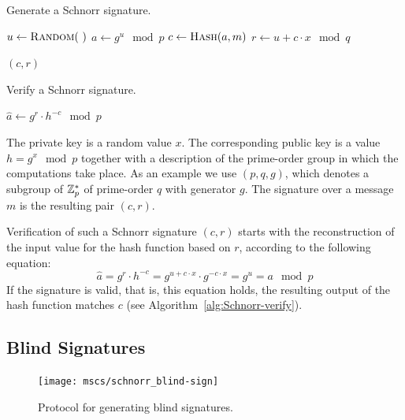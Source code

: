 \begin{algorithm}
  \caption{Generate a Schnorr signature.}
  \label{alg:Schnorr-sign}
  \addtolength{\baselineskip}{1mm}
  \begin{algorithmic}[1]
      \State $u \gets \Call{Random}{~}$
      \State $a \gets g^u \mod p$
      \State $c \gets \Call{Hash}{a, m}$
      \State $r \gets u + c \cdot x \mod q$

      \Return $(c, r)$
    \EndFunction
  \end{algorithmic}
\end{algorithm}
\begin{algorithm}
  \caption{Verify a Schnorr signature.}
  \label{alg:Schnorr-verify}
  \addtolength{\baselineskip}{1mm}
  \begin{algorithmic}[1]
      \State $\hat{a} \gets g^r \cdot h^{-c} \mod p$

        \Return {}
      \EndIf

      \Return {}
    \EndFunction
  \end{algorithmic}
\end{algorithm}

The private key is a random value $x$. The corresponding public key is a value
$h = g^x \mod p$ together with a description of the prime-order group in which
the computations take place. As an example we use $(p, q, g)$, which denotes a
subgroup of $\mathbb{Z}^*_p$ of prime-order $q$ with generator $g$. The signature over
a message $m$ is the resulting pair $(c, r)$.

Verification of such a Schnorr signature $(c, r)$ starts with the reconstruction
of the input value for the hash function based on $r$, according to the
following equation:
\begin{equation}\label{eqn:Schnorr-verify}
  \hat{a} = g^r \cdot h^{-c} = g^{u + c \cdot x} \cdot g^{-c \cdot x} = g^u = a \mod p
\end{equation}
If the signature is valid, that is, this equation holds, the resulting output of
the hash function matches $c$ (see Algorithm~\ref{alg:Schnorr-verify}).

\subsection{Blind Signatures}

\begin{figure}[ht]
  \centering
  \texttt{[image: mscs/schnorr\_blind-sign]}
  \caption{Protocol for generating blind signatures.}
  \label{msc:schnorr_blind-sign}
\end{figure}

